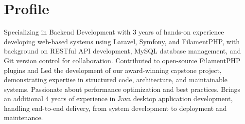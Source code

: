\documentclass[legal,10pt]{article}
\begin{document}
\section{Profile}
\begin{justify}
Specializing in Backend Development with 3 years of hands-on experience developing web-based systems using Laravel, Symfony, and FilamentPHP, with background on RESTful API development, MySQL database management, and Git version control for collaboration. Contributed to open-source FilamentPHP plugins and Led the development of our award-winning capstone project, demonstrating expertise in structured code, architecture, and maintainable systems. Passionate about performance optimization and best practices. Brings an additional 4 years of experience in Java desktop application development, handling end-to-end delivery, from system development to deployment and maintenance.
\end{justify}


\end{document}
